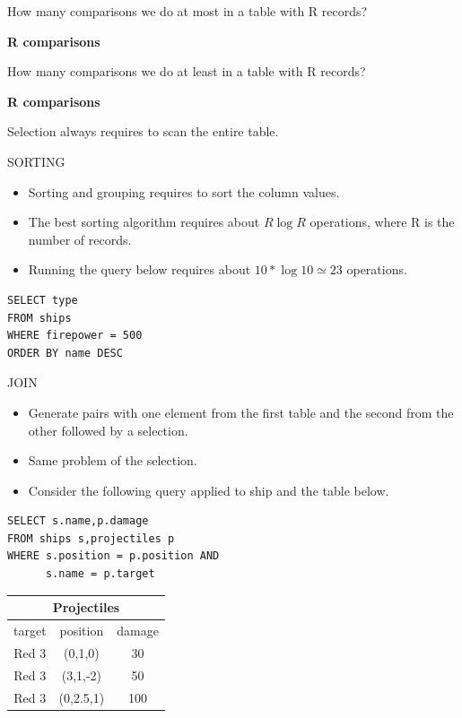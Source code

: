 \documentclass{beamer}
\begin{document}
\begin{slide}{
\item How many comparisons we do at most in a table with R records?
\pause
\item \textbf{R comparisons}
\pause
\item How many comparisons we do at least in a table with R records?
\pause
\item \textbf{R comparisons}
\pause
\item Selection always requires to scan the entire table.
}\end{slide}

\begin{frame}[fragile]{SORTING}
\begin{itemize}
\item Sorting and grouping requires to sort the column values.
\item The best sorting algorithm requires about $R\log R$ operations, where R is the number of records.
\item Running the query below requires about $10 * \log 10 \simeq 23$ operations.
\end{itemize}

\begin{lstlisting}
SELECT type
FROM ships
WHERE firepower = 500
ORDER BY name DESC
\end{lstlisting}
\end{frame}

\begin{frame}[fragile]{JOIN}
\begin{itemize}
\item Generate pairs with one element from the first table and the second from the other followed by a selection.
\item Same problem of the selection.
\item Consider the following query applied to ship and the table below.
\end{itemize}

\begin{lstlisting}
SELECT s.name,p.damage
FROM ships s,projectiles p
WHERE s.position = p.position AND
      s.name = p.target
\end{lstlisting}




\tiny
\begin{tabular}{|c|c|c|}
\hline
\multicolumn{3}{|c|}{\textbf{Projectiles}} \\
\hline
target & position & damage \\
\hline
Red 3 & (0,1,0) & 30 \\
\hline
Red 3 & (3,1,-2) & 50 \\
\hline
Red 3 & (0,2.5,1) & 100 \\
\hline
\end{tabular} 
\end{frame}
\end{document}
